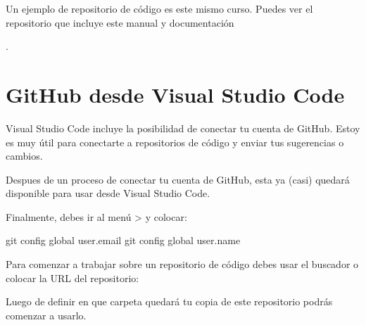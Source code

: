 \documentclass[a5paper,9pt,spanish]{sphinxmanual}
\begin{document}
\sphinxAtStartPar
Un ejemplo de repositorio de código es este mismo curso.
Puedes ver el repositorio que incluye este manual y documentación
%
\begin{footnote}[7]\sphinxAtStartFootnote
{}
%
\end{footnote}.

\noindent{}


\section{GitHub desde Visual Studio Code}
\label{\detokenize{github:github-desde-visual-studio-code}}
\sphinxAtStartPar
Visual Studio Code incluye la posibilidad de conectar tu cuenta de GitHub.
Estoy es muy útil para conectarte a repositorios de código y enviar tus
sugerencias o cambios.

\noindent{}

\sphinxAtStartPar
Despues de un proceso de conectar tu cuenta de GitHub, esta ya
(casi) quedará disponible para usar desde Visual Studio Code.

\noindent{}

\sphinxAtStartPar
Finalmente, debes ir al menú  \sphinxhyphen{}\textgreater{}  y colocar:

\begin{sphinxVerbatim}[commandchars=\\\{\}]
git config \PYGZhy{}\PYGZhy{}global user.email 
git config \PYGZhy{}\PYGZhy{}global user.name 
\end{sphinxVerbatim}

\noindent{}

\sphinxAtStartPar
Para comenzar a trabajar sobre un repositorio de código debes usar el
buscador o colocar la URL del repositorio:

\noindent{}

\sphinxAtStartPar
Luego de definir en que carpeta quedará tu copia de este repositorio
podrás comenzar a usarlo.
\end{document}
